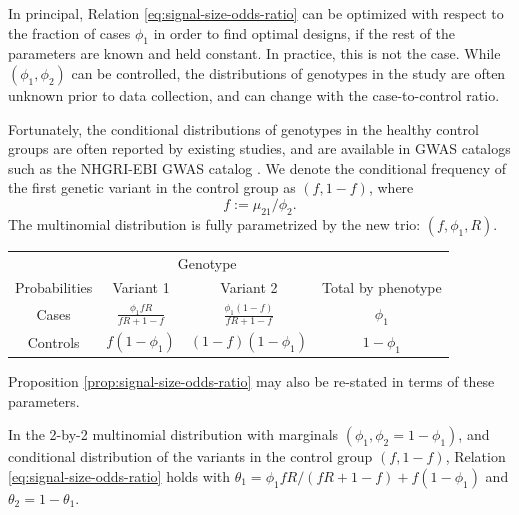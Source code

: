 In principal, Relation \eqref{eq:signal-size-odds-ratio} can be optimized with respect to the fraction of cases $\phi_1$ in order to find optimal designs, if the rest of the parameters are known and held constant.
In practice, this is not the case.
While $(\phi_1, \phi_2)$ can be controlled, the distributions of genotypes in the study are often unknown prior to data collection, and can change with the case-to-control ratio.

Fortunately, the conditional distributions of genotypes in the healthy control groups are often reported by existing studies, and are available in GWAS catalogs such as the NHGRI-EBI GWAS catalog \cite{macarthur2016new}.
We denote the conditional frequency of the first genetic variant in the control group as $(f, 1-f)$, where
$$
f := \mu_{21} / \phi_2.
$$
The multinomial distribution is fully parametrized by the new trio: $(f, \phi_1, R)$.
\begin{center}
    \begin{tabular}{cccc}
    \hline
    & \multicolumn{2}{c}{Genotype} \\
    \cline{2-3}
    Probabilities & Variant 1 & Variant 2 & Total by phenotype \\
    \hline
    Cases & $\frac{\phi_1fR}{fR+1-f}$ & $\frac{\phi_1(1-f)}{fR+1-f}$ & $\phi_1$ \\
    Controls & $f(1-\phi_1)$ & $(1-f)(1-\phi_1)$ & $1-\phi_1$ \\
    \hline
    \end{tabular}
\end{center}
Proposition \ref{prop:signal-size-odds-ratio} may also be re-stated in terms of these parameters.


\begin{corollary} \label{cor:signal-size-odds-ratio-conditional-frequency}
In the 2-by-2 multinomial distribution with marginals $(\phi_1, \phi_2 = 1-\phi_1)$, and conditional distribution of the variants in the control group $(f, 1-f)$,
Relation \eqref{eq:signal-size-odds-ratio} holds with $\theta_1 = {\phi_1fR}/{(fR+1-f)} + f(1-\phi_1)$ and $\theta_2 = 1-\theta_1$.
\end{corollary} 

